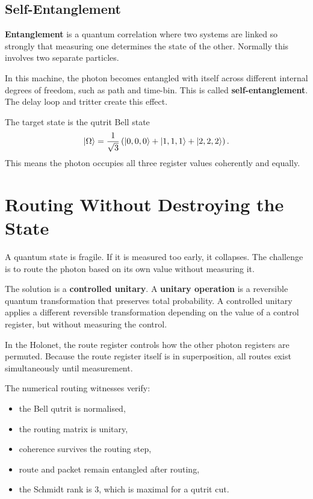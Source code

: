 \documentclass[11pt]{article}
\begin{document}
\subsection{Self-Entanglement}
\textbf{Entanglement} is a quantum correlation where two systems are linked so strongly that measuring one determines the state of the other. Normally this involves two separate particles.

In this machine, the photon becomes entangled with itself across different internal degrees of freedom, such as path and time-bin. This is called \textbf{self-entanglement}. The delay loop and tritter create this effect.

The target state is the qutrit Bell state
\begin{equation}
\ket{\Omega} = \frac{1}{\sqrt{3}}\left(\ket{0,0,0} + \ket{1,1,1} + \ket{2,2,2}\right).
\end{equation}
This means the photon occupies all three register values coherently and equally.

\section{Routing Without Destroying the State}
A quantum state is fragile. If it is measured too early, it collapses. The challenge is to route the photon based on its own value without measuring it.

The solution is a \textbf{controlled unitary}. A \textbf{unitary operation} is a reversible quantum transformation that preserves total probability. A controlled unitary applies a different reversible transformation depending on the value of a control register, but without measuring the control.

In the Holonet, the route register controls how the other photon registers are permuted. Because the route register itself is in superposition, all routes exist simultaneously until measurement.

The numerical routing witnesses verify:
\begin{itemize}[leftmargin=1.5em]
    \item the Bell qutrit is normalised,
    \item the routing matrix is unitary,
    \item coherence survives the routing step,
    \item route and packet remain entangled after routing,
    \item the Schmidt rank is 3, which is maximal for a qutrit cut.
\end{itemize}
\end{document}
